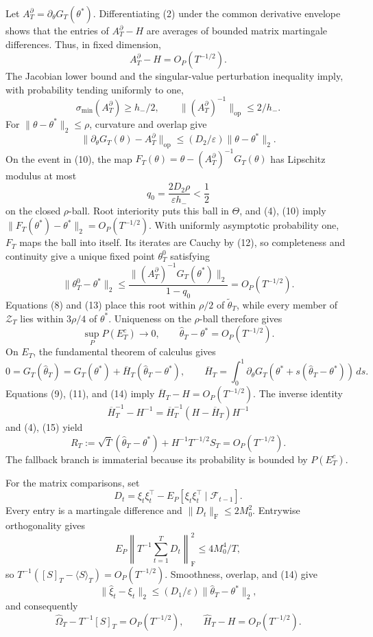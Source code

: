 Let \(A_T^\partial=\partial_\theta G_T(\theta^*)\). Differentiating (2) under the common derivative envelope shows that the entries of \(A_T^\partial-H\) are averages of bounded matrix martingale differences. Thus, in fixed dimension,
\[
 A_T^\partial-H=O_P(T^{-1/2}).
\tag{9}
\]
The Jacobian lower bound and the singular-value perturbation inequality imply, with probability tending uniformly to one,
\[
 \sigma_{\min}(A_T^\partial)\ge h_-/2,
 \qquad \|(A_T^\partial)^{-1}\|_{\mathrm{op}}\le2/h_-.
\tag{10}
\]
For \(\|\theta-\theta^*\|_2\le\rho\), curvature and overlap give
\[
 \|\partial_\theta G_T(\theta)-A_T^\partial\|_{\mathrm{op}}
 \le(D_2/\varepsilon)\|\theta-\theta^*\|_2.
\tag{11}
\]
On the event in (10), the map \(F_T(\theta)=\theta-(A_T^\partial)^{-1}G_T(\theta)\) has Lipschitz modulus at most
\[
 q_0=\frac{2D_2\rho}{\varepsilon h_-}<\frac12
\tag{12}
\]
on the closed \(\rho\)-ball. Root interiority puts this ball in \(\Theta\), and (4), (10) imply \(\|F_T(\theta^*)-\theta^*\|_2=O_P(T^{-1/2})\). With uniformly asymptotic probability one, \(F_T\) maps the ball into itself. Its iterates are Cauchy by (12), so completeness and continuity give a unique fixed point \(\theta_T^0\) satisfying
\[
 \|\theta_T^0-\theta^*\|_2
 \le\frac{\|(A_T^\partial)^{-1}G_T(\theta^*)\|_2}{1-q_0}
 =O_P(T^{-1/2}).
\tag{13}
\]
Equations (8) and (13) place this root within \(\rho/2\) of \(\widetilde\theta_T\), while every member of \(\mathcal Z_T\) lies within \(3\rho/4\) of \(\theta^*\). Uniqueness on the \(\rho\)-ball therefore gives
\[
 \sup_P P(E_T^c)\longrightarrow0,
 \qquad \widehat\theta_T-\theta^*=O_P(T^{-1/2}).
\tag{14}
\]
On \(E_T\), the fundamental theorem of calculus gives
\[
 0=G_T(\widehat\theta_T)=G_T(\theta^*)+\overline H_T
 (\widehat\theta_T-\theta^*),
 \qquad
 \overline H_T=\int_0^1\partial_\theta G_T
 (\theta^*+s(\widehat\theta_T-\theta^*))\,ds.
\tag{15}
\]
Equations (9), (11), and (14) imply \(\overline H_T-H=O_P(T^{-1/2})\). The inverse identity
\[
 \overline H_T^{-1}-H^{-1}
 =\overline H_T^{-1}(H-\overline H_T)H^{-1}
\tag{16}
\]
and (4), (15) yield
\[
 R_T:=\sqrt T(\widehat\theta_T-\theta^*)
 +H^{-1}T^{-1/2}S_T=O_P(T^{-1/2}).
\tag{17}
\]
The fallback branch is immaterial because its probability is bounded by \(P(E_T^c)\).

For the matrix comparisons, set
\[
 D_t=\xi_t\xi_t^\top-E_P[\xi_t\xi_t^\top\mid\mathcal F_{t-1}].
\tag{18}
\]
Every entry is a martingale difference and \(\|D_t\|_{\mathrm F}\le2M_0^2\). Entrywise orthogonality gives
\[
 E_P\left\|T^{-1}\sum_{t=1}^TD_t\right\|_{\mathrm F}^2
 \le4M_0^4/T,
\tag{19}
\]
so \(T^{-1}([S]_T-\langle S\rangle_T)=O_P(T^{-1/2})\). Smoothness, overlap, and (14) give
\[
 \|\widehat\xi_t-\xi_t\|_2
 \le(D_1/\varepsilon)\|\widehat\theta_T-\theta^*\|_2,
\tag{20}
\]
and consequently
\[
 \widehat\Omega_T-T^{-1}[S]_T=O_P(T^{-1/2}),
 \qquad \widehat H_T-H=O_P(T^{-1/2}).
\tag{21}
\]

